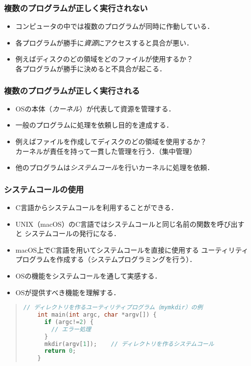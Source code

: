 \documentclass{beamer}                 %
\begin{document}
\begin{frame}
  \frametitle{複数のプログラムが正しく実行されない}
  \begin{itemize}
  \item コンピュータの中では複数のプログラムが同時に作動している．
  \item 各プログラムが勝手に\emph{資源}にアクセスすると具合が悪い．
  \item 例えばディスクのどの領域をどのファイルが使用するか？\\
    各プログラムが勝手に決めると不具合が起こる．
  \end{itemize}
\end{frame}

\begin{frame}
  \frametitle{複数のプログラムが正しく実行される}
  \begin{itemize}
  \item OSの本体（\emph{カーネル}）が代表して資源を管理する．
  \item 一般のプログラムに処理を依頼し目的を達成する．
  \item 例えばファイルを作成してディスクのどの領域を使用するか？\\
    カーネルが責任を持って一貫した管理を行う．（集中管理）
  \item 他のプログラムは\emph{システムコール}を行いカーネルに処理を依頼．
  \end{itemize}
\end{frame}

\begin{frame}[fragile]
  \frametitle{システムコールの使用}
  \begin{itemize}
  \item C言語からシステムコールを利用することができる．
  \item UNIX（macOS）のC言語ではシステムコールと同じ名前の関数を呼び出すと
    システムコールの発行になる．
  \item macOS上でC言語を用いてシステムコールを直接に使用する
    ユーティリティプログラムを作成する（システムプログラミングを行う）．
  \item OSの機能をシステムコールを通して実感する．
  \item OSが提供すべき機能を理解する．
  \end{itemize}
  \begin{quote}
\begin{lstlisting}[language=C++]
    // ディレクトリを作るユーティリティプログラム（mymkdir）の例
    int main(int argc, char *argv[]) {
      if (argc!=2) {
        // エラー処理
      }
      mkdir(argv[1]);    // ディレクトリを作るシステムコール
      return 0;
    }
\end{lstlisting}
  \end{quote}
\end{frame}
\end{document}
